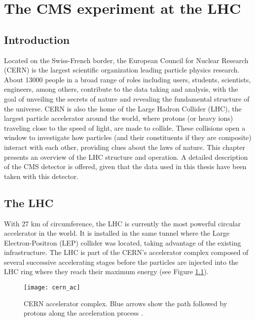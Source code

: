 \chapter{The CMS experiment at the LHC}\label{ch:cms}

\section{Introduction}\label{sec:cms_intro}
Located on the Swiss-French border, the European Council for Nuclear Research (CERN) is the largest scientific organization leading particle physics research. About 13000 people in a broad range of roles including users, students, scientists, engineers, among others, contribute to the data taking and analysis, with the goal of unveiling the secrets of nature and revealing the fundamental structure of the universe. CERN is also the home of the Large Hadron Collider (LHC), the largest particle accelerator around the world, where protons (or heavy ions) traveling close to the speed of light, are made to collide. These collisions open a window to investigate how particles (and their constituents if they are composite) interact with each other, providing clues about the laws of nature. This chapter presents an overview of the LHC structure and operation. A detailed description of the CMS detector is offered, given that the data used in this thesis have been taken with this detector.     

\section{The LHC}\label{sec:lhc}

With 27 km of circumference, the LHC is currently the most powerful circular accelerator in the world. It is installed in the same tunnel where the Large Electron-Positron (LEP) collider was located, taking advantage of the existing infrastructure. The LHC is part of the CERN's accelerator complex composed of several successive accelerating stages before the particles are injected into the LHC ring where they reach their maximum energy (see Figure \ref{fig:cern}).

\begin{figure}[!h]
  \centering
  \texttt{[image: cern\_ac]}
  \caption[CERN accelerator complex]{CERN accelerator complex. Blue arrows show the path followed by protons along the acceleration process \cite{cern}.}\label{fig:cern}
\end{figure}

